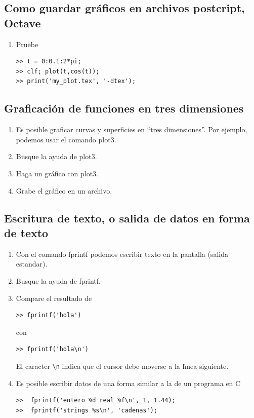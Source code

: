 \subsection{Como guardar gr\'{a}ficos en archivos postcript, Octave}

\begin{enumerate}
\item Pruebe
\begin{verbatim}
>> t = 0:0.1:2*pi;
>> clf; plot(t,cos(t));
>> print('my_plot.tex', '-dtex');
\end{verbatim}
\end{enumerate}

\subsection{Graficaci\'{o}n de funciones en tres dimensiones}

\begin{enumerate}
\item Es posible graficar curvas y superficies en ``tres dimensiones''. Por
ejemplo, podemos usar el comando plot3.

\item Busque la ayuda de plot3.
        
\item Haga un gr\'{a}fico con plot3.

\item Grabe el gr\'{a}fico en un archivo.
\end{enumerate}

\subsection{Escritura de texto, o salida de datos en forma de texto}

\begin{enumerate}
\item Con el comando fprintf podemos escribir texto en la pantalla
  (salida estandar).

\item Busque la ayuda de fprintf.

\item Compare el resultado de
\begin{verbatim}
>> fprintf('hola')
\end{verbatim}
con
\begin{verbatim}
>> fprintf('hola\n')
\end{verbatim}
El caracter \verb-\n- indica que el cursor debe moverse a la
l\'{\i}nea siguiente.

\item Es posible escribir datos de una forma similar a la de un
  programa en C
\begin{verbatim}
>>  fprintf('entero %d real %f\n', 1, 1.44);
>>  fprintf('strings %s\n', 'cadenas');
\end{verbatim}

\end{enumerate}

